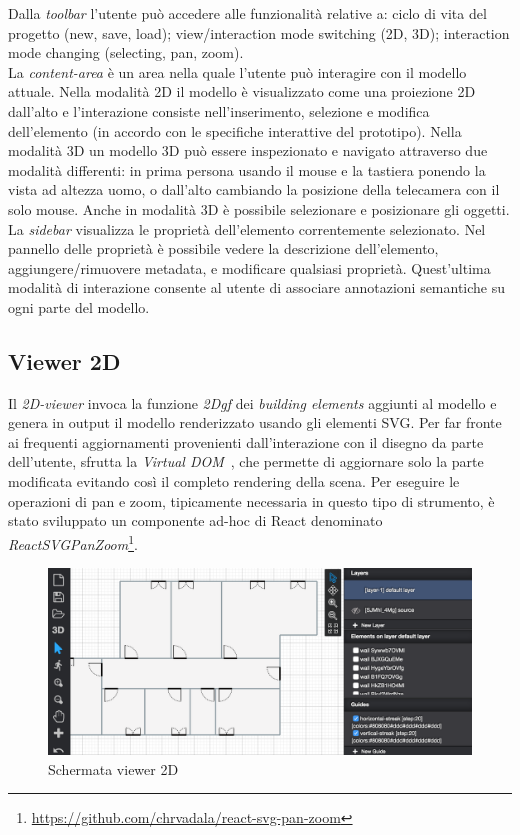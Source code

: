 Dalla  \emph{toolbar} l'utente pu\`o accedere alle funzionalit\`a relative a: ciclo di vita del progetto (new, save, load);
view/interaction mode switching (2D, 3D); interaction mode changing (selecting, pan, zoom).\\
La \emph{content-area} \`e un area nella quale l'utente pu\`o interagire con il modello attuale. Nella modalit\`a 2D
il modello \`e visualizzato come una proiezione 2D dall'alto e l'interazione consiste nell'inserimento, selezione e modifica
dell'elemento (in accordo con le specifiche interattive del prototipo). Nella modalità 3D un modello 3D pu\`o essere
inspezionato e navigato attraverso due modalità differenti: in prima persona usando il mouse e la tastiera ponendo la vista
ad altezza uomo, o dall'alto cambiando la posizione della telecamera con il solo mouse. Anche in modalità 3D è possibile
selezionare e posizionare gli oggetti.\\
La \emph{sidebar} visualizza le propriet\`a dell'elemento correntemente selezionato. Nel pannello delle propriet\`a \`e possibile
vedere la descrizione dell'elemento, aggiungere/rimuovere metadata, e modificare qualsiasi propriet\`a.
Quest'ultima modalità di interazione consente al utente di associare annotazioni semantiche su ogni parte del modello.
\newpage

\subsection{Viewer 2D}
Il \emph{2D-viewer} invoca la funzione \emph{2Dgf} dei \emph{building elements} aggiunti al modello e
genera in output il modello renderizzato usando gli elementi SVG.
Per far fronte ai frequenti aggiornamenti provenienti dall'interazione con il disegno da parte dell'utente,
sfrutta la \emph{Virtual DOM}~\cite{vdom}, che permette di aggiornare solo la parte modificata evitando così
il completo rendering della scena. Per eseguire le operazioni di pan e zoom, tipicamente necessaria in questo
tipo di strumento, è stato sviluppato un componente ad-hoc
di React denominato \emph{ReactSVGPanZoom}\footnote{\url{https://github.com/chrvadala/react-svg-pan-zoom}}.\\


\begin{figure}[htbp] %
   \centering
   \includegraphics[width=1\linewidth]{images/2d}
   \caption{Schermata viewer 2D}
   \label{fig:view2D}
\end{figure}
\newpage


